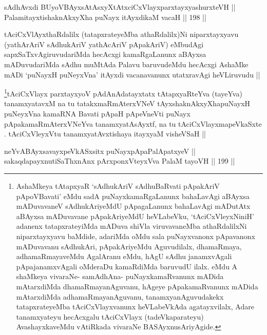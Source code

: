 
\begin{shl}
sAdhAvxdi BUyoVBAyxsAtAsxyXtAtxciCxVlayxparxtayxyashurxteVH || \\
PalamitayxtishaknAkxyX\s \s ha puNayx itAyxdikaM vacaH \hfill || 198 ||  
\end{shl}

\begin{artha}
tAciCxVlAyxthaRdalilx (tatapxrateyeMba athaRdalilx)Ni niparxtayxyavu
(yathArAriV sAdhukAriV yathAcAriV pApakAriV) eMbudAgi
sapxSaTxvAgiruvudariMda hecAcxgi kamaRgaLanunx aBAyxsa mADuvudariMda
sAdhu muMtAda Palavu baruvudeMdu hecAcxgi AshaMke mADi `puNayxH
puNeyxVna' itAyxdi vacanavanunx utatxravAgi heVLiruvudu ||
\end{artha}


\footnote{AshaMkeya tAtapxyaR `sAdhukAriV sAdhuBaRvati pApakAriV
pApoVBavati' eMdu sadA puNayxkamaRgaLanunx bahaLavAgi aBAyxsa
mADuvavaneV sAdhukAriyeMdU pApagaLanunx bahaLavAgi mADutAtx aBAyxsa
mADuvavane pApakAriyeMdU heVLabeVku, `tAciCxVleyxNiniH' adanenx
tatapxrateyiMda mADuva shiVla viruvavaneMba athaRdalilxNi
niparxtayxyavu baMdide, adariMda oMdu sala puNayxvanonx pApavanonx
mADuvavanu sAdhukAri, pApakAriyeMdu Aguvudilalx, dhamaRmaya,
adhamaRmayaveMdu AgalAranu eMdu, hAgU sAdhu janamxvAgali
pApajanamxvAgali oMderaDu kamaRdiMda baruvudU ilalx. eMdu A shaMkeya
vivaraNe- samAdhAna- puNayxkamaRvanunx mADida mAtarxdiMda
dhamaRmayanAguvanu, hAgeye pApakamaRvanunx mADida mAtarxdiMda
adhamaRmayanAguvanu, tanamxyanAguvudakekx tatapxrateyeMba
tAciCxVlayxvanunx heVLabeVkAda agatayxvilalx, Adare tanamxyateyu
hecAcxgalu tAciCxVlayx (tadeVkaparateyu) AvashayxkaveMdu vAtiRkada
vivaraNe BASAyxnusAriyAgide.}tAciCxVlayx parxtayxyoV pAdAnAdatayxtatx tAtapxyaRteYva (tayeYva) tanamxyatavxM na tu tatakxmaRmAterxVNeV tAyxshaknAkxyX\s \s hapuNayxH puNeyxVna kamaRNA Bavati pApaH pApeVneVti puNayx pApakamaRmAterxVNeYva tanamxyatAsAyxtf, na tu tAciCxVlayxmapeVkaSxte . tAciCxVleyxVtu tanamxyatAvxtishaya itayxyaM visheVSaH ||


\begin{shl}
neYvABAyxsavayxpeVkASx\s sitx puNayxpApaPalApatxyeV || \\
sakaqdapayxnutiSaThxnAnx pArxponxVteyxVva PalaM tayoVH \hfill || 199 || 
\end{shl}

